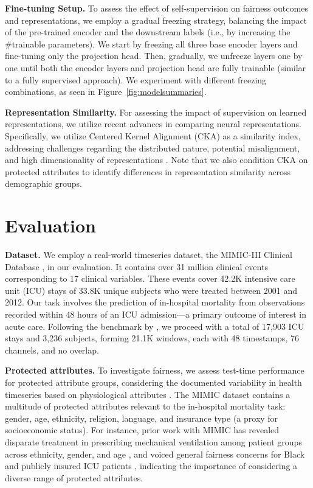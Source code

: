 \documentclass[letterpaper]{article} %
\begin{document}
\smallskip
\noindent\textbf{Fine-tuning Setup.} To assess the effect of self-supervision on fairness outcomes and representations, we employ a gradual freezing strategy, balancing the impact of the pre-trained encoder and the downstream labels (i.e., by increasing the  \#trainable parameters). We start by freezing all three base encoder layers and fine-tuning only the projection head. Then, gradually, we unfreeze layers one by one until both the encoder layers and projection head are fully trainable (similar to a fully supervised approach). We experiment with different freezing combinations, as seen in Figure~\ref{fig:modelsummaries}.\hfill
\smallskip 

\noindent\textbf{Representation Similarity.}
For assessing the impact of supervision on learned representations, we utilize recent advances in comparing neural representations. Specifically, we utilize Centered Kernel Alignment (CKA) as a similarity index, addressing challenges regarding the distributed nature, potential misalignment, and high dimensionality of representations \cite{kornblith2019similarity}. Note that we also condition CKA on protected attributes to identify differences in representation similarity across demographic groups.

\section{Evaluation}
\label{sec:evaluation}


\noindent\textbf{Dataset.} We employ a real-world timeseries dataset, the MIMIC-III Clinical Database \cite{johnson2016mimic}, in our evaluation. It contains over 31 million clinical events corresponding to 17 clinical variables.
These events cover 42.2K intensive care unit (ICU) stays of 33.8K unique subjects who were treated between 2001 and 2012. Our task involves the prediction of in-hospital mortality from observations recorded within 48 hours of an ICU admission---a primary outcome of interest in acute care. Following the benchmark by \citet{harutyunyan2019multitask}, we proceed with a total of 17,903 ICU stays and 3,236 subjects, forming 21.1K windows, each with 48 timestamps, 76 channels, and no overlap.


\smallskip
\noindent\textbf{Protected attributes.} To investigate fairness, we assess test-time performance for protected attribute groups, considering the documented variability in health timeseries based on physiological attributes \cite{spathis2021self}.
The MIMIC dataset contains a multitude of protected attributes relevant to the in-hospital mortality task: gender, age, ethnicity, religion, language, and insurance type (a proxy for socioeconomic status). For instance, prior work with MIMIC has revealed disparate treatment in prescribing mechanical ventilation among patient groups across ethnicity, gender, and age \cite{meng2022interpretability}, and voiced general fairness concerns for Black and publicly insured ICU patients \cite{roosli2022peeking}, indicating the importance of considering a diverse range of protected attributes. 
\smallskip
\end{document}
